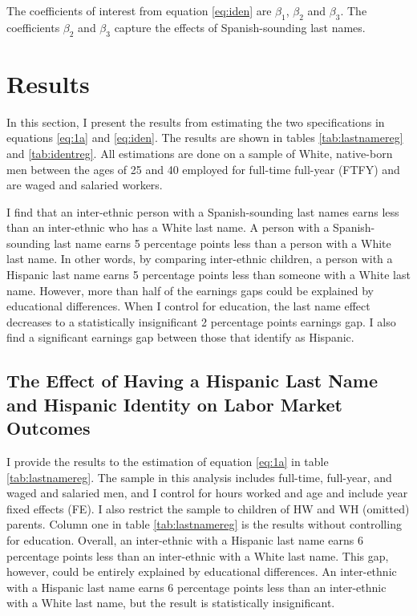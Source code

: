 \documentclass{wptemp}
\begin{document}
The coefficients of interest from equation \ref{eq:iden} are $\beta_{1}$, $\beta_{2}$ and $\beta_{3}$. The coefficients $\beta_{2}$ and $\beta_{3}$ capture the effects of Spanish-sounding last names.

\section{Results}\label{sec:results}

In this section, I present the results from estimating the two specifications in equations \ref{eq:1a} and \ref{eq:iden}. The results are shown in tables \ref{tab:lastnamereg} and \ref{tab:identreg}. All estimations are done on a sample of White, native-born men between the ages of 25 and 40 employed for full-time full-year (FTFY) and are waged and salaried workers.

I find that an inter-ethnic person with a Spanish-sounding last names earns less than an inter-ethnic who has a White last name. A person with a Spanish-sounding last name earns 5 percentage points less than a person with a White last name. In other words, by comparing inter-ethnic children, a person with a Hispanic last name earns 5 percentage points less than someone with a White last name. However, more than half of the earnings gaps could be explained by educational differences. When I control for education, the last name effect decreases to a statistically insignificant 2 percentage points earnings gap. I also find a significant earnings gap between those that identify as Hispanic. 

\subsection{The Effect of Having a Hispanic Last Name and Hispanic Identity on Labor Market Outcomes}

I provide the results to the estimation of equation \ref{eq:1a} in table \ref{tab:lastnamereg}. The sample in this analysis includes full-time, full-year, and waged and salaried men, and I control for hours worked and age and include year fixed effects (FE). I also restrict the sample to children of HW and WH (omitted) parents. Column one in table \ref{tab:lastnamereg} is the results without controlling for education. Overall, an inter-ethnic with a Hispanic last name earns 6 percentage points less than an inter-ethnic with a White last name. This gap, however, could be entirely explained by educational differences. An inter-ethnic with a Hispanic last name earns 6 percentage points less than an inter-ethnic with a White last name, but the result is statistically insignificant.
\end{document}

